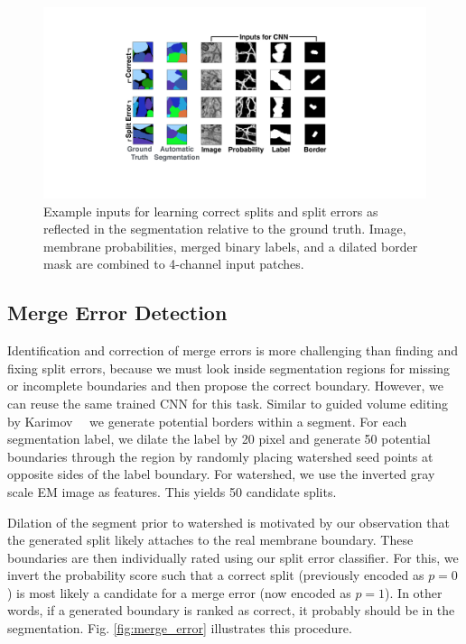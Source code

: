 \begin{figure}[h]
\begin{center}
  \includegraphics[width=\linewidth]{gfx/cnn_inputs.pdf}
\end{center}
  \vspace{-4mm}
   \caption{Example inputs for learning correct splits and split errors as reflected in the segmentation relative to the ground truth. Image, membrane probabilities, merged binary labels, and a dilated border mask are combined to 4-channel input patches.}
\label{fig:cnn_inputs}
\end{figure}


\subsection{Merge Error Detection}

Identification and correction of merge errors is more challenging than finding and fixing split errors, because we must look inside segmentation regions for missing or incomplete boundaries and then propose the correct boundary. However, we can reuse the same trained CNN for this task. Similar to guided volume editing by Karimov~\etal~\cite{karimov_guided_volume_editing} we generate potential borders within a segment. For each segmentation label, we dilate the label by 20 pixel and generate 50 potential boundaries through the region by randomly placing watershed seed points at opposite sides of the label boundary. For watershed, we use the inverted gray scale EM image as features. This yields 50 candidate splits. 

Dilation of the segment prior to watershed is motivated by our observation that the generated split likely attaches to the real membrane boundary. These boundaries are then individually rated using our split error classifier. For this, we invert the probability score such that a correct split (previously encoded as $p=0$) is most likely a candidate for a merge error (now encoded as $p=1$). In other words, if a generated boundary is ranked as correct, it probably should be in the segmentation. Fig. \ref{fig:merge_error} illustrates this procedure.

